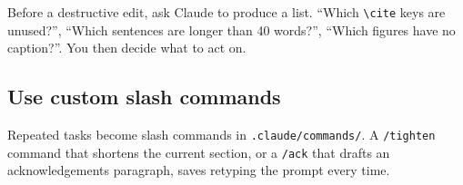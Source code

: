 Before a destructive edit, ask Claude to produce a list. ``Which \verb|\cite| keys are unused?'', ``Which sentences are longer than 40 words?'', ``Which figures have no caption?''. You then decide what to act on.

\subsection{Use custom slash commands}

Repeated tasks become slash commands in \verb|.claude/commands/|. A \verb|/tighten| command that shortens the current section, or a \verb|/ack| that drafts an acknowledgements paragraph, saves retyping the prompt every time.
